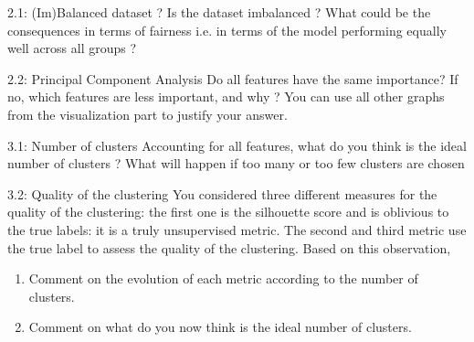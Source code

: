 \documentclass [a4paper, 12pt] {article}
\begin{document}
\begin{question}{2.1: (Im)Balanced dataset ?}
Is the dataset imbalanced ? What could be the consequences in terms of fairness i.e. in terms of the model performing equally well across all groups ?
\end{question}
\begin{answer}\color{blue} 
\end{answer}

\begin{question}{2.2: Principal Component Analysis}
Do all features have the same importance? If no, which features are less important, and why ? You can use all other graphs from the visualization part to justify your answer.
\end{question}
\begin{answer}\color{blue}
\end{answer}

\begin{question}{3.1: Number of clusters}
Accounting for all features, what do you think is the ideal number of clusters ? What will happen if too many or too few clusters are chosen
\end{question}
\begin{answer} \color{blue}
\end{answer}

\begin{question}{3.2: Quality of the clustering}
You considered three different measures for the quality of the clustering: the first one is the silhouette score and is oblivious to the true labels: it is a truly unsupervised metric. The second and third metric use the true label to assess the quality of the clustering. Based on this observation,
\begin{enumerate}
    \item Comment on the evolution of each metric according to the number of clusters.
    \item Comment on what do you now think is the ideal number of clusters.
\end{enumerate}
\end{question}
\begin{answer}\color{blue}
\end{answer}
\end{document}
